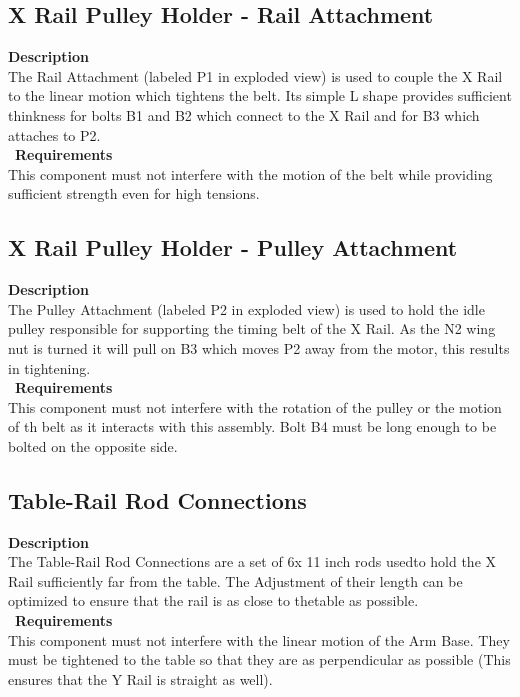 \documentclass[titlepage]{article}
\begin{document}


\subsection{X Rail Pulley Holder - Rail Attachment}
\textbf{Description}\\
The Rail Attachment (labeled P1 in exploded view) is used to couple the X Rail to the linear motion which tightens the belt. Its simple L shape provides sufficient thinkness for bolts B1 and B2 which connect to the X Rail and for B3 which attaches to P2. \\\
\textbf{Requirements}\\
This component must not interfere with the motion of the belt while providing sufficient strength even for high tensions.


\subsection{X Rail Pulley Holder - Pulley Attachment}
\textbf{Description}\\
The Pulley Attachment (labeled P2 in exploded view) is used to hold the idle pulley responsible for supporting the timing belt of the X Rail. As the N2 wing nut is turned it will pull on B3 which moves P2 away from the motor, this results in tightening.\\\
\textbf{Requirements}\\
This component must not interfere with the rotation of the pulley or the motion of th belt as it interacts with this assembly. Bolt B4 must be long enough to be bolted on the opposite side. 


\subsection{Table-Rail Rod Connections}
\textbf{Description}\\
The Table-Rail Rod Connections are a set of 6x 11 inch rods usedto hold the X Rail sufficiently far from the table. The Adjustment of their length can be optimized to ensure that the rail is as close to thetable as possible.\\\
\textbf{Requirements}\\
This component must not interfere with the linear motion of the Arm Base. They must be tightened to the table so that they are as perpendicular as possible (This ensures that the Y Rail is straight as well).
\end{document}
